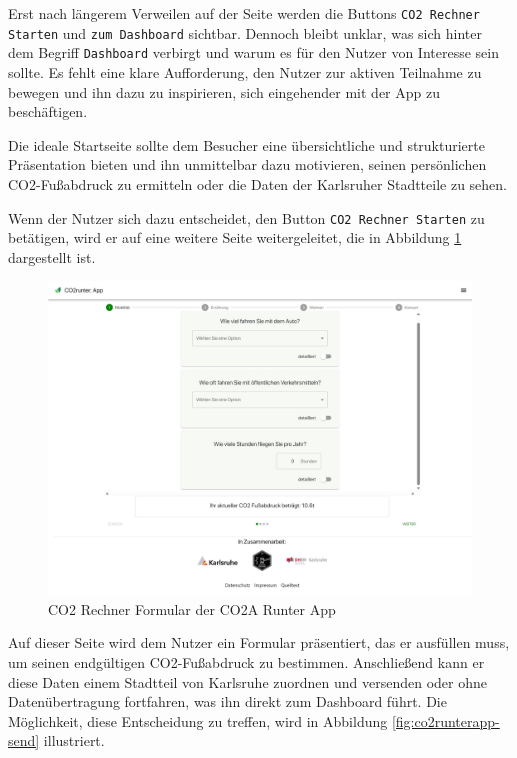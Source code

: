 Erst nach längerem Verweilen auf der Seite werden die Buttons \texttt{CO2 Rechner Starten} und \texttt{zum Dashboard} sichtbar. Dennoch bleibt unklar, was sich hinter dem Begriff \texttt{Dashboard} verbirgt und warum es für den Nutzer von Interesse sein sollte. Es fehlt eine klare Aufforderung, den Nutzer zur aktiven Teilnahme zu bewegen und ihn dazu zu inspirieren, sich eingehender mit der App zu beschäftigen.

Die ideale Startseite sollte dem Besucher eine übersichtliche und strukturierte Präsentation bieten und ihn unmittelbar dazu motivieren, seinen persönlichen CO2-Fußabdruck zu ermitteln oder die Daten der Karlsruher Stadtteile zu sehen.

Wenn der Nutzer sich dazu entscheidet, den Button \texttt{CO2 Rechner Starten} zu betätigen, wird er auf eine weitere Seite weitergeleitet, die in Abbildung \ref{fig:co2runterapp-rechner} dargestellt ist.

\begin{figure}[h]
    \centering
    \includegraphics[width=1\textwidth]{images/02/CO2-Runter-App-Rechner.jpeg}
    \caption{CO2 Rechner Formular der CO2A Runter App}
    \label{fig:co2runterapp-rechner}
\end{figure}

\newpage

Auf dieser Seite wird dem Nutzer ein Formular präsentiert, das er ausfüllen muss, um seinen endgültigen CO2-Fußabdruck zu bestimmen. Anschließend kann er diese Daten einem Stadtteil von Karlsruhe zuordnen und versenden oder ohne Datenübertragung fortfahren, was ihn direkt zum Dashboard führt. Die Möglichkeit, diese Entscheidung zu treffen, wird in Abbildung \ref{fig:co2runterapp-send} illustriert.

